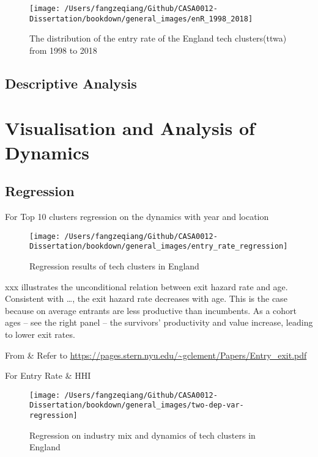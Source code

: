 \documentclass[
  12pt,
  oneside]{book}
\begin{document}
\begin{figure}
\texttt{[image: /Users/fangzeqiang/Github/CASA0012-Dissertation/bookdown/general\_images/enR\_1998\_2018]} \caption{The distribution of the entry rate of the England tech clusters(ttwa) from 1998 to 2018}\label{fig:fig-enR-1998-2018}
\end{figure}

\hypertarget{descriptive-analysis}{%
\subsection{Descriptive Analysis}\label{descriptive-analysis}}

\hypertarget{visualisation-and-analysis-of-dynamics}{%
\section{Visualisation and Analysis of Dynamics}\label{visualisation-and-analysis-of-dynamics}}

\hypertarget{regression}{%
\subsection{Regression}\label{regression}}

For Top 10 clusters regression on the dynamics with year and location

\begin{figure}
\texttt{[image: /Users/fangzeqiang/Github/CASA0012-Dissertation/bookdown/general\_images/entry\_rate\_regression]} \caption{Regression results of tech clusters in England}\label{fig:fig-regression-entry-rate}
\end{figure}

xxx illustrates the unconditional relation between exit hazard rate and age. Consistent with \ldots, the exit hazard rate decreases with age. This is the case because on average entrants are less productive than incumbents. As a cohort ages -- see the right panel -- the survivors' productivity and value increase, leading to lower exit rates.

From \& Refer to \url{https://pages.stern.nyu.edu/~gclement/Papers/Entry_exit.pdf}

For Entry Rate \& HHI

\begin{figure}
\texttt{[image: /Users/fangzeqiang/Github/CASA0012-Dissertation/bookdown/general\_images/two-dep-var-regression]} \caption{Regression on industry mix and  dynamics of tech clusters in England}\label{fig:fig-regression-mix-entry}
\end{figure}
\end{document}
